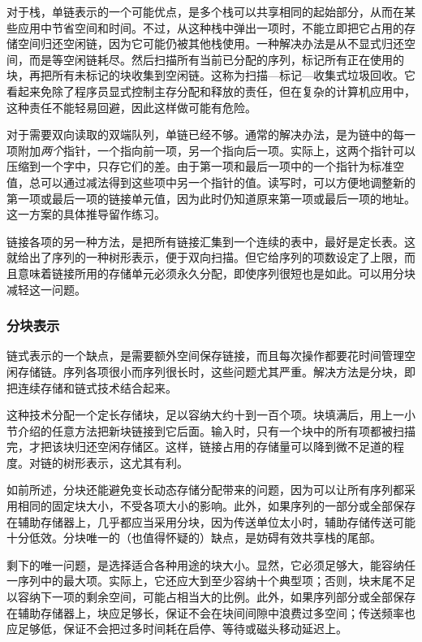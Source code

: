 对于栈，单链表示的一个可能优点，是多个栈可以共享相同的起始部分，从而在某些应用中节省空间和时间。不过，从这种栈中弹出一项时，不能立即把它占用的存储空间归还空闲链，因为它可能仍被其他栈使用。一种解决办法是从不显式归还空间，而是等空闲链耗尽。然后扫描所有当前已分配的序列，标记所有正在使用的块，再把所有未标记的块收集到空闲链。这称为扫描—标记—收集式垃圾回收。它看起来免除了程序员显式控制主存分配和释放的责任，但在复杂的计算机应用中，这种责任不能轻易回避，因此这样做可能有危险。

对于需要双向读取的双端队列，单链已经不够。通常的解决办法，是为链中的每一项附加\textit{两个}指针，一个指向前一项，另一个指向后一项。实际上，这两个指针可以压缩到一个字中，只存它们的差。由于第一项和最后一项中的一个指针为标准空值，总可以通过减法得到这些项中另一个指针的值。读写时，可以方便地调整新的第一项或最后一项的链接单元值，因为此时仍知道原来第一项或最后一项的地址。这一方案的具体推导留作练习。

链接各项的另一种方法，是把所有链接汇集到一个连续的表中，最好是定长表。这就给出了序列的一种树形表示，便于双向扫描。但它给序列的项数设定了上限，而且意味着链接所用的存储单元必须永久分配，即使序列很短也是如此。可以用分块减轻这一问题。

\subsubsection{分块表示}

链式表示的一个缺点，是需要额外空间保存链接，而且每次操作都要花时间管理空闲存储链。序列各项很小而序列很长时，这些问题尤其严重。解决方法是分块，即把连续存储和链式技术结合起来。

这种技术分配一个定长存储块，足以容纳大约十到一百个项。块填满后，用上一小节介绍的任意方法把新块链接到它后面。输入时，只有一个块中的所有项都被扫描完，才把该块归还空闲存储区。这样，链接占用的存储量可以降到微不足道的程度。对链的树形表示，这尤其有利。

如前所述，分块还能避免变长动态存储分配带来的问题，因为可以让所有序列都采用相同的固定块大小，不受各项大小的影响。此外，如果序列的一部分或全部保存在辅助存储器上，几乎都应当采用分块，因为传送单位太小时，辅助存储传送可能十分低效。分块唯一的（也值得怀疑的）缺点，是妨碍有效共享栈的尾部。

剩下的唯一问题，是选择适合各种用途的块大小。显然，它必须足够大，能容纳任一序列中的最大项。实际上，它还应大到至少容纳十个典型项；否则，块末尾不足以容纳下一项的剩余空间，可能占相当大的比例。此外，如果序列部分或全部保存在辅助存储器上，块应足够长，保证不会在块间间隙中浪费过多空间；传送频率也应足够低，保证不会把过多时间耗在启停、等待或磁头移动延迟上。

